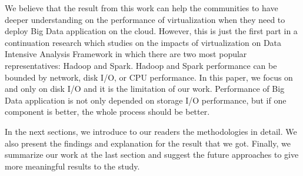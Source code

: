 \documentclass{acmsig}
\begin{document}
We believe that the result from this work can help the communities to have deeper understanding on the performance of virtualization when they need to deploy Big Data application on the cloud. However, this is just the first part in a continuation research which studies on the impacts of virtualization on Data Intensive Analysis Framework in which there are two most popular representatives: Hadoop and Spark. Hadoop and Spark performance can be bounded by network, disk I/O, or CPU performance. In this paper, we focus on and only on disk I/O and it is the limitation of our work. Performance of Big Data application is not only depended on storage I/O performance, but if one component is better, the whole process should be better.

In the next sections, we introduce to our readers the methodologies in detail. We also present the findings and explanation for the result that we got. Finally, we summarize our work at the last section and suggest the future approaches to give more meaningful results to the study.

\end{document}
